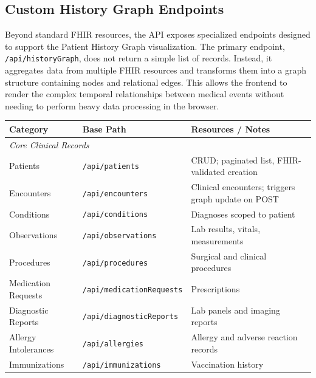\subsection{Custom History Graph Endpoints}
Beyond standard FHIR resources, the API exposes specialized endpoints designed
to support the Patient History Graph visualization. The primary endpoint,
\texttt{/api/historyGraph}, does not return a simple list of records. Instead,
it aggregates data from multiple FHIR resources and transforms them into a
graph structure containing nodes and relational edges. This allows the frontend
to render the complex temporal relationships between medical events without
needing to perform heavy data processing in the browser.

\begin{table}[H]
    \centering
    \small
    \begin{tabular}{|l|l|p{6.2cm}|}
        \hline
        \textbf{Category} & \textbf{Base Path} & \textbf{Resources / Notes} \\
        \hline
        \hline
        \multicolumn{3}{|l|}{\textit{Core Clinical Records}} \\
        \hline
        Patients           & \texttt{/api/patients}             & CRUD; paginated list, FHIR-validated creation \\
        \hline
        Encounters         & \texttt{/api/encounters}           & Clinical encounters; triggers graph update on POST \\
        \hline
        Conditions         & \texttt{/api/conditions}           & Diagnoses scoped to patient \\
        \hline
        Observations       & \texttt{/api/observations}         & Lab results, vitals, measurements \\
        \hline
        Procedures         & \texttt{/api/procedures}           & Surgical and clinical procedures \\
        \hline
        Medication Requests & \texttt{/api/medicationRequests}  & Prescriptions \\
        \hline
        Diagnostic Reports & \texttt{/api/diagnosticReports}    & Lab panels and imaging reports \\
        \hline
        Allergy Intolerances & \texttt{/api/allergies}          & Allergy and adverse reaction records \\
        \hline
        Immunizations      & \texttt{/api/immunizations}        & Vaccination history \\

\end{tabular}
\end{table}
